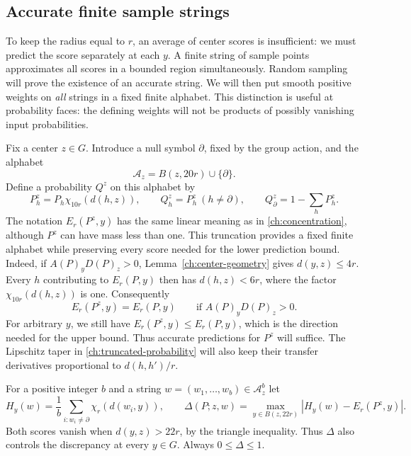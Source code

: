 \subsection{Accurate finite sample strings}

To keep the radius equal to $r$, an average of center scores is insufficient:
we must predict the score separately at each $y$.  A finite string of sample
points approximates all scores in a bounded region simultaneously.  Random
sampling will prove the existence of an accurate string.  We will then put
smooth positive weights on \emph{all} strings in a fixed finite alphabet.
This distinction is useful at probability faces: the defining weights will
not be products of possibly vanishing input probabilities.

Fix a center $z\in G$.  Introduce a null symbol $\partial$, fixed by the
group action, and the alphabet
\[
 \mathcal A_z=B(z,20r)\cup\{\partial\}.
\]
Define a probability $Q^z$ on this alphabet by
\begin{equation}
 P^z_h=P_h\chi_{10r}(d(h,z)),\qquad
 Q^z_h=P^z_h\ (h\ne\partial),\qquad
 Q^z_\partial=1-\sum_hP^z_h.
 \label{ch:truncated-probability}
\end{equation}
The notation $E_r(P^z,y)$ has the same linear meaning as in
\eqref{ch:concentration}, although $P^z$ can have mass less than one.
This truncation provides a fixed finite alphabet while preserving every
score needed for the lower prediction bound.  Indeed, if
$A(P)_yD(P)_z>0$, Lemma~\ref{ch:center-geometry} gives $d(y,z)\le4r$.
Every $h$ contributing to $E_r(P,y)$ then has $d(h,z)<6r$, where the
factor $\chi_{10r}(d(h,z))$ is one.  Consequently
\begin{equation}
 E_r(P^z,y)=E_r(P,y)
 \qquad\text{if }A(P)_yD(P)_z>0.
 \label{ch:truncation-exactness}
\end{equation}
For arbitrary $y$, we still have $E_r(P^z,y)\le E_r(P,y)$, which is the
direction needed for the upper bound.  Thus accurate predictions for $P^z$
will suffice.  The Lipschitz taper in \eqref{ch:truncated-probability} will
also keep their transfer derivatives proportional to $d(h,h')/r$.

For a positive integer $b$ and a string $w=(w_1,\ldots,w_b)\in\mathcal A_z^b$
let
\begin{equation}
 H_y(w)=\frac1b\sum_{i:w_i\ne\partial}\chi_r(d(w_i,y)),
 \qquad
 \Delta(P;z,w)=\max_{y\in B(z,22r)}
          |H_y(w)-E_r(P^z,y)|.
 \label{ch:string-discrepancy}
\end{equation}
Both scores vanish when $d(y,z)>22r$, by the triangle inequality.  Thus
$\Delta$ also controls the discrepancy at every $y\in G$.  Always
$0\le\Delta\le1$.

